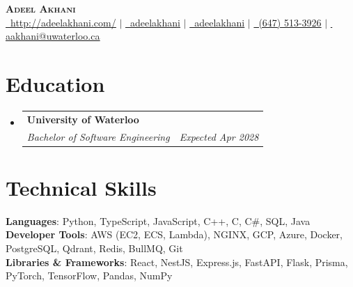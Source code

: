 \documentclass[letterpaper,11pt]{article}
\makeatletter
\newcommand{\resumeSubheading}[4]{
  \vspace{-2pt}\item
    \begin{tabular*}{0.97\textwidth}[t]{l@{\extracolsep{\fill}}r}
      \textbf{#1} & #2 \\
      \textit{\small#3} & \textit{\small #4} \\
    \end{tabular*}\vspace{-7pt}
}
\newcommand{\resumeSubHeadingListStart}{\begin{itemize}[leftmargin=0.15in, label={}]}
\newcommand{\resumeSubHeadingListEnd}{\end{itemize}}
\makeatother
\begin{document}
\begin{center}
    \textbf{\Huge \scshape Adeel Akhani} \\ \vspace{1pt}
    \small
    \href{http://adeelakhani.com/}{\faGlobe\, \underline{http://adeelakhani.com/}} $|$
    \href{https://www.linkedin.com/in/adeelakhani/}{\faLinkedin\, \underline{adeelakhani}} $|$ 
    \href{https://github.com/adeelakhani}{\faGithub\, \underline{adeelakhani}} $|$
    \href{tel:(647) 513-3926}{\faMobile*\, (647) 513-3926} $|$
    \href{mailto:aakhani@uwaterloo.ca}{\faEnvelope\, \underline{aakhani@uwaterloo.ca}}
\end{center}
\section{Education}
    \resumeSubHeadingListStart
        \resumeSubheading
            {University of Waterloo}{}
            {Bachelor of Software Engineering}{\textit{Expected Apr 2028}}
        \resumeSubHeadingListEnd
\section{Technical Skills}
\begin{itemize}[leftmargin=0.15in, label={}]
    \small{\item{
    \textbf{Languages}{: Python, TypeScript, JavaScript, C++, C, C\#, SQL, Java} \\
    \textbf{Developer Tools}{: AWS (EC2, ECS, Lambda), NGINX, GCP, Azure, Docker, PostgreSQL, Qdrant, Redis, BullMQ, Git} \\
    \textbf{Libraries \& Frameworks}{: React, NestJS, Express.js, FastAPI, Flask, Prisma, PyTorch, TensorFlow, Pandas, NumPy} 
    }}
\end{itemize}
\end{document}
